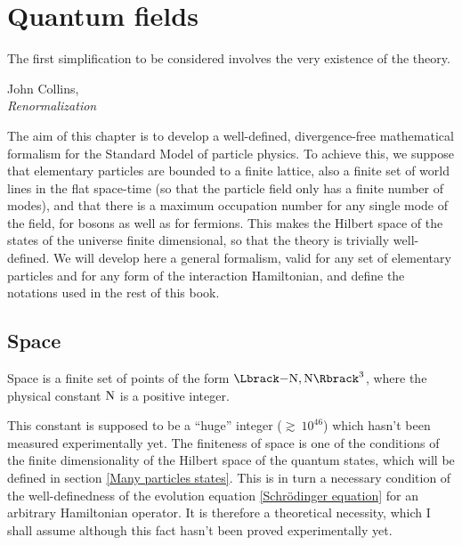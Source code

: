 \chapter{Quantum fields}
\label{Quantum fields}

\renewcommand{\epigraphwidth}{7cm}
\epigraph{The first simplification to be considered involves the very existence of the theory.}{John Collins,\\\textit{Renormalization}~\cite{Collins1984}}

The aim of this chapter is to develop a well-defined, divergence-free mathematical formalism for the Standard Model of particle physics. To achieve this, we suppose that elementary particles are bounded to a finite lattice, also a finite set of world lines in the flat space-time (so that the particle field only has a finite number of modes), and that there is a maximum occupation number for any single mode of the field, for bosons as well as for fermions. This makes the Hilbert space of the states of the universe finite dimensional, so that the theory is trivially well-defined. We will develop here a general formalism, valid for any set of elementary particles and for any form of the interaction Hamiltonian, and define the notations used in the rest of this book.

\section{Space}

 Space is a finite set of points of the form $\FL$, where the physical constant $\mathrm N$ is a positive integer.

 This constant is supposed to be a ``huge'' integer ($\gtrsim~10^{46}$) which hasn't been measured experimentally yet. The finiteness of space is one of the conditions of the finite dimensionality of the Hilbert space of the quantum states, which will be defined in section \ref{Many particles states}. This is in turn a necessary condition of the well-definedness of the evolution equation \ref{Schrödinger equation} for an arbitrary Hamiltonian operator. It is therefore a theoretical necessity, which I shall assume although this fact hasn't been proved experimentally yet.

